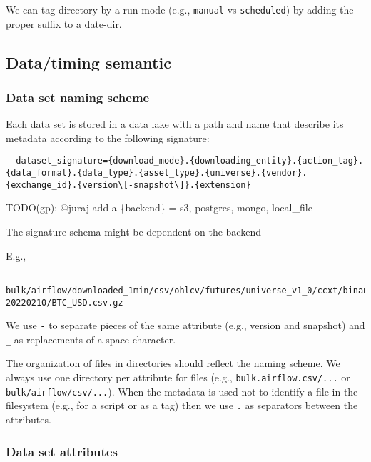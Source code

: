 \documentclass[11pt, reqno]{amsart}
\theoremstyle{definition}
\theoremstyle{remark}
\begin{document}
  We can tag directory by a run mode (e.g., \verb|manual| vs \verb|scheduled|)
  by adding the proper suffix to a date-dir.

  \subsection{Data/timing semantic}

  \subsubsection{Data set naming scheme}
  \label{data-set-naming-scheme}

  Each data set is stored in a data lake with a path and name that describe its
  metadata according to the following signature:

  \begin{verbatim}
  dataset_signature={download_mode}.{downloading_entity}.{action_tag}.{data_format}.{data_type}.{asset_type}.{universe}.{vendor}.{exchange_id}.{version\[-snapshot\]}.{extension}
  \end{verbatim}

  TODO(gp): @juraj add a \{backend\} = s3, postgres, mongo, local\_file

  The signature schema might be dependent on the backend

  E.g.,

  \begin{verbatim}
  bulk/airflow/downloaded_1min/csv/ohlcv/futures/universe_v1_0/ccxt/binance/v1_0-20220210/BTC_USD.csv.gz
  \end{verbatim}

  We use \verb|-| to separate pieces of the same attribute (e.g., version and snapshot)
  and \verb|_| as replacements of a space character.

  The organization of files in directories should reflect the naming scheme. We always
  use one directory per attribute for files (e.g., \verb|bulk.airflow.csv/...|
  or \verb|bulk/airflow/csv/...|). When the metadata is used not to identify a
  file in the filesystem (e.g., for a script or as a tag) then we use \verb|.|
  as separators between the attributes.

  \subsubsection{Data set attributes}
  \label{data-set-attributes}
\end{document}
